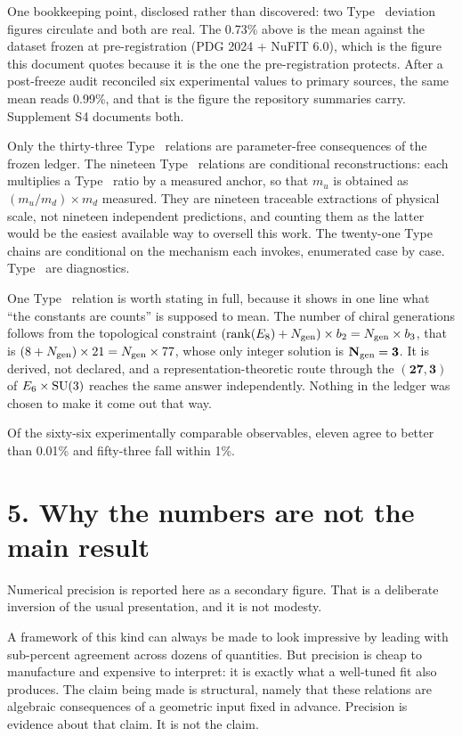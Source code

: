 \documentclass[11pt,a4paper]{article}
\begin{document}
One bookkeeping point, disclosed rather than discovered: two Type~\typeI{}
deviation figures circulate and both are real. The 0.73\% above is the
mean against the dataset frozen at pre-registration (PDG 2024 + NuFIT
6.0), which is the figure this document quotes because it is the one the
pre-registration protects. After a post-freeze audit reconciled six
experimental values to primary sources, the same mean reads 0.99\%, and
that is the figure the repository summaries carry. Supplement S4 documents
both.

Only the thirty-three Type~\typeI{} relations are parameter-free
consequences of the frozen ledger. The nineteen Type~\typeII{} relations
are conditional reconstructions: each multiplies a Type~\typeI{} ratio by
a measured anchor, so that $m_u$ is obtained as $(m_u/m_d) \times m_d$
measured. They are nineteen traceable extractions of physical scale, not
nineteen independent predictions, and counting them as the latter would be
the easiest available way to oversell this work. The twenty-one
Type~\typeIII{} chains are conditional on the mechanism each invokes,
enumerated case by case. Type~\typeIV{} are diagnostics.

One Type~\typeI{} relation is worth stating in full, because it shows in
one line what ``the constants are counts'' is supposed to mean. The number
of chiral generations follows from the topological constraint
$(\mathrm{rank}(E_8) + N_{\rm gen}) \times b_2 = N_{\rm gen} \times b_3$,
that is $(8 + N_{\rm gen}) \times 21 = N_{\rm gen} \times 77$, whose only
integer solution is $\mathbf{N_{\rm gen} = 3}$. It is derived, not
declared, and a representation-theoretic route through the
$(\mathbf{27}, \mathbf{3})$ of $E_6 \times \mathrm{SU}(3)$ reaches the same
answer independently. Nothing in the ledger was chosen to make it come out
that way.

Of the sixty-six experimentally comparable observables, eleven agree to
better than 0.01\% and fifty-three fall within 1\%.

\section{5. Why the numbers are not the main result}

Numerical precision is reported here as a secondary figure. That is a
deliberate inversion of the usual presentation, and it is not modesty.

A framework of this kind can always be made to look impressive by leading
with sub-percent agreement across dozens of quantities. But precision is
cheap to manufacture and expensive to interpret: it is exactly what a
well-tuned fit also produces. The claim being made is structural, namely
that these relations are algebraic consequences of a geometric input fixed
in advance. Precision is evidence about that claim. It is not the claim.
\end{document}
